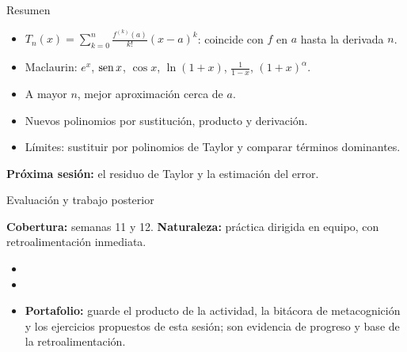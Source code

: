 \documentclass[10pt,aspectratio=169]{beamer}
\begin{document}
\begin{frame}{Resumen}
  \begin{itemize}
    \item $T_n(x)=\sum_{k=0}^n\frac{f^{(k)}(a)}{k!}(x-a)^k$: coincide con $f$ en $a$ hasta la derivada $n$.
    \item Maclaurin: $e^x$, $\operatorname{sen} x$, $\cos x$, $\ln(1+x)$, $\frac1{1-x}$, $(1+x)^\alpha$.
    \item A mayor $n$, mejor aproximación cerca de $a$.
    \item Nuevos polinomios por sustitución, producto y derivación.
    \item Límites: sustituir por polinomios de Taylor y comparar términos dominantes.
  \end{itemize}
  \vspace{3mm}
  \textbf{Próxima sesión:} el residuo de Taylor y la estimación del error.
\end{frame}


\begin{frame}{Evaluación y trabajo posterior}
  \small
  \begin{evalbox}
    \textbf{Cobertura:} semanas 11 y 12. \textbf{Naturaleza:} práctica dirigida en equipo, con retroalimentación inmediata.
  \end{evalbox}
  \begin{itemize}
    \item \criterios
    \item \declaracionia
    \item \textbf{Portafolio:} guarde el producto de la actividad, la bitácora de metacognición y los ejercicios propuestos de esta sesión; son evidencia de progreso y base de la retroalimentación.
  \end{itemize}
\end{frame}
\end{document}
